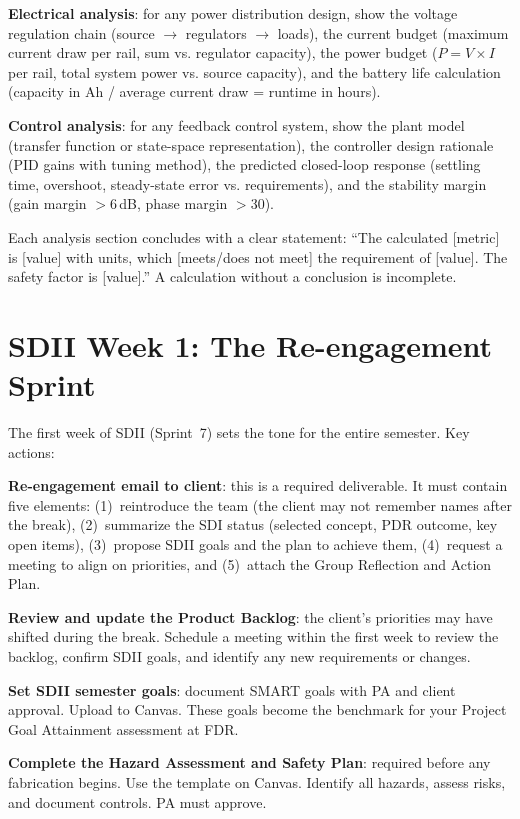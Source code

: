\textbf{Electrical analysis}: for any power distribution design, show the voltage regulation chain (source $\to$ regulators $\to$ loads), the current budget (maximum current draw per rail, sum vs. regulator capacity), the power budget ($P = V \times I$ per rail, total system power vs. source capacity), and the battery life calculation (capacity in Ah / average current draw = runtime in hours).

\textbf{Control analysis}: for any feedback control system, show the plant model (transfer function or state-space representation), the controller design rationale (PID gains with tuning method), the predicted closed-loop response (settling time, overshoot, steady-state error vs. requirements), and the stability margin (gain margin $>$6\,dB, phase margin $>$30\degC{}).

Each analysis section concludes with a clear statement: ``The calculated [metric] is [value] with units, which [meets/does not meet] the requirement of [value]. The safety factor is [value].'' A calculation without a conclusion is incomplete.

\section{SDII Week 1: The Re-engagement Sprint}
The first week of SDII (Sprint~7) sets the tone for the entire semester. Key actions:

\textbf{Re-engagement email to client}: this is a required deliverable. It must contain five elements: (1)~reintroduce the team (the client may not remember names after the break), (2)~summarize the SDI status (selected concept, PDR outcome, key open items), (3)~propose SDII goals and the plan to achieve them, (4)~request a meeting to align on priorities, and (5)~attach the Group Reflection and Action Plan.

\textbf{Review and update the Product Backlog}: the client's priorities may have shifted during the break. Schedule a meeting within the first week to review the backlog, confirm SDII goals, and identify any new requirements or changes.

\textbf{Set SDII semester goals}: document SMART goals with PA and client approval. Upload to Canvas. These goals become the benchmark for your Project Goal Attainment assessment at FDR.

\textbf{Complete the Hazard Assessment and Safety Plan}: required before any fabrication begins. Use the template on Canvas. Identify all hazards, assess risks, and document controls. PA must approve.

